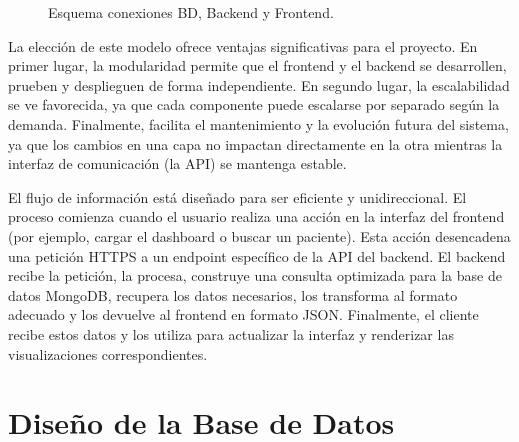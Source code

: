 \begin{figure}[H]
    \centering
    \caption{Esquema conexiones BD, Backend y Frontend.}
\end{figure}




La elección de este modelo ofrece ventajas significativas para el proyecto. En primer lugar, la modularidad permite que el frontend y el backend se desarrollen, prueben y desplieguen de forma independiente. En segundo lugar, la escalabilidad se ve favorecida, ya que cada componente puede escalarse por separado según la demanda. Finalmente, facilita el mantenimiento y la evolución futura del sistema, ya que los cambios en una capa no impactan directamente en la otra mientras la interfaz de comunicación (la API) se mantenga estable.


El flujo de información está diseñado para ser eficiente y unidireccional. El proceso comienza cuando el usuario realiza una acción en la interfaz del frontend (por ejemplo, cargar el dashboard o buscar un paciente). Esta acción desencadena una petición HTTPS a un endpoint específico de la API del backend. El backend recibe la petición, la procesa, construye una consulta optimizada para la base de datos MongoDB, recupera los datos necesarios, los transforma al formato adecuado y los devuelve al frontend en formato JSON. Finalmente, el cliente recibe estos datos y los utiliza para actualizar la interfaz y renderizar las visualizaciones correspondientes.


\section{Diseño de la Base de Datos}

